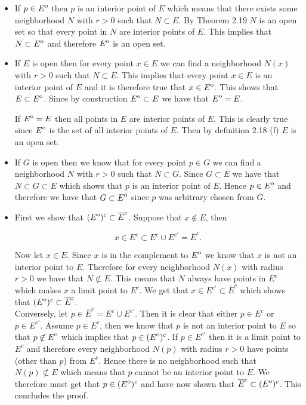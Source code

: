 \documentclass[11pt]{article}
\author{Hesam Pakdaman}
\date{\today}
\title{}
\newcommand{\interior}[1]{{\kern0pt#1}^{\mathrm{o}}}
\begin{document}
\begin{itemize}

\item[\noindent\textbf{9.} (a)] If $p \in \interior{E}$ then $p$ is an
  interior point of $E$ which means that there exists some
  neighborhood $N$ with $r > 0$ such that $N \subset E$. By Theorem
  2.19 $N$ is an open set so that every point in $N$ are interior
  points of $E$. This implies that $N \subset \interior{E}$ and
  therefore $\interior{E}$ is an open set.

\item[(b)] If $E$ is open then for every point $x \in E$ we can find a
  neighborhood $N(x)$ with $r > 0$ such that $N \subset E$. This
  implies that every point $x \in E$ is an interior point of $E$ and
  it is therefore true that $x \in \interior{E}$. This shows that
  $E \subset \interior{E}$. Since by construction
  $\interior{E} \subset E$ we have that $\interior{E} = E$.

  If $\interior{E} = E$ then all points in $E$ are interior points of
  $E$. This is clearly true since $\interior{E}$ is the set of all
  interior points of $E$. Then by definition 2.18 (f) $E$ is an open
  set.

\item[(c)] If $G$ is open then we know that for every point $p \in G$
  we can find a neighborhood $N$ with $r > 0$ such that $N \subset
  G$. Since $G \subset E$ we have that $N \subset G \subset E$ which
  shows that $p$ is an interior point of $E$. Hence
  $p \in \interior{E}$ and therefore we have that
  $G \subset \interior{E}$ since $p$ was arbitrary chosen from $G$.

\item[(d)] First we show that
  $(\interior{E})^c \subset \overline{E}^c$. Suppose that
  $x \notin E$, then

  $$ x \in E^c \subset E^c \cup E^{c'} = \overline{E}^c.$$

  Now let $x \in E$. Since $x$ is in the complement to $\interior{E}$
  we know that $x$ is not an interior point to $E$. Therefore for
  every neighborhood $N(x)$ with radius $r > 0$ we have that
  $N \not\subset E$. This means that $N$ always have points in
  $E^c$ which makes $x$ a limit point to $E^c$.  We get that
  $x \in E^{c'} \subset \overline{E}^c$ which shows that
  $(\interior{E})^c \subset \overline{E}^c$. \\

  Conversely, let $p \in \overline{E}^c = E^c \cup E^{c'}$. Then it is
  clear that either $p \in E^c$ or $p \in E^{c'}$. Assume $p \in E^c$,
  then we know that $p$ is not an interior point to $E$ so that
  $p \not\in \interior{E}$ which implies that
  $p \in (\interior{E})^c$. If $p \in E^{c'}$ then it is a limit point
  to $E^c$ and therefore every neighborhood $N(p)$ with radius $r > 0$
  have points (other than $p$) from $E^c$. Hence there is no
  neighborhood such that $N(p) \not\subset E$ which means that $p$
  cannot be an interior point to $E$. We therefore must get that
  $p \in (\interior{E})^c$ and have now shown that
  $\overline{E}^c \subset (\interior{E})^c$. This concludes the proof.


\end{itemize}
\end{document}
